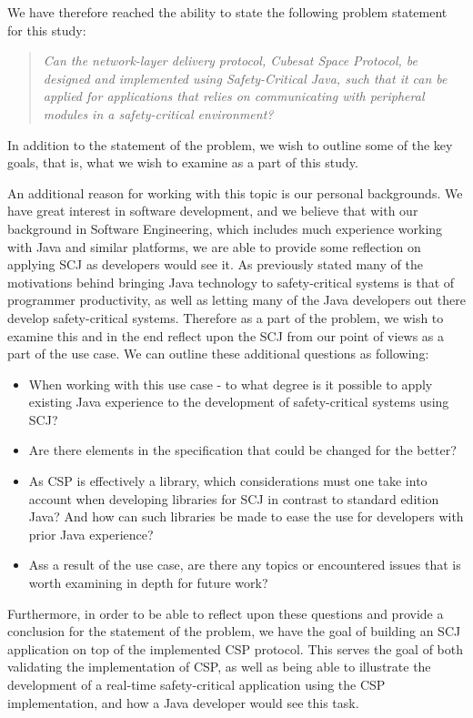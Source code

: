 We have therefore reached the ability to state the following problem statement for this study:
\begin{quotation}
	\textit{Can the network-layer delivery protocol, Cubesat Space Protocol, be designed and implemented using Safety-Critical Java, such that it can be applied for applications that relies on communicating with peripheral modules in a safety-critical environment?}
\end{quotation}
In addition to the statement of the problem, we wish to outline some of the key goals, that is, what we wish to examine as a part of this study.

An additional reason for working with this topic is our personal backgrounds. We have great interest in software development, and we believe that with our background in Software Engineering, which includes much experience working with Java and similar platforms, we are able to provide some reflection on applying SCJ as developers would see it. As previously stated many of the motivations behind bringing Java technology to safety-critical systems is that of programmer productivity, as well as letting many of the Java developers out there develop safety-critical systems. Therefore as a part of the problem, we wish to examine this and in the end reflect upon the SCJ from our point of views as a part of the use case. We can outline these additional questions as following:
\begin{itemize}
	\item When working with this use case - to what degree is it possible to apply existing Java experience to the development of safety-critical systems using SCJ?
	\item Are there elements in the specification that could be changed for the better?
	\item As CSP is effectively a library, which considerations must one take into account when developing libraries for SCJ in contrast to standard edition Java? And how can such libraries be made to ease the use for developers with prior Java experience?
	\item Ass a result of the use case, are there any topics or encountered issues that is worth examining in depth for future work?
\end{itemize}

Furthermore, in order to be able to reflect upon these questions and provide a conclusion for the statement of the problem, we have the goal of building an SCJ application on top of the implemented CSP protocol. This serves the goal of both 
validating the implementation of CSP, as well as being able to illustrate the development of a real-time safety-critical application using the CSP implementation, and how a Java developer would see this task.




